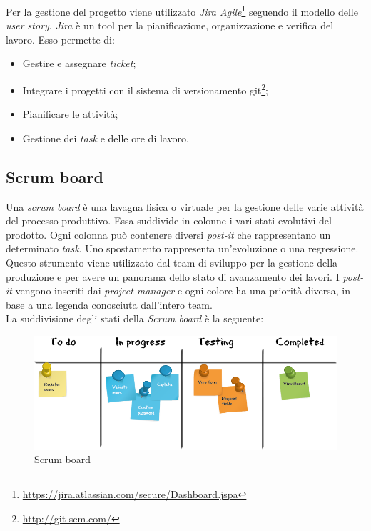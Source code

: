 Per la gestione del progetto viene utilizzato \textit{Jira Agile}\footnote{\url{https://jira.atlassian.com/secure/Dashboard.jspa}} seguendo il modello delle \textit{user story}. \textit{Jira} è un tool per la pianificazione, organizzazione e verifica del lavoro. Esso permette di:
\begin{itemize}
	\item Gestire e assegnare \textit{ticket};
	\item Integrare i progetti con il sistema di versionamento \gls{git}\footnote{\url{http://git-scm.com/}};
	\item Pianificare le attività;
	\item Gestione dei \textit{task }e delle ore di lavoro.
\end{itemize}

\subsection*{Scrum board}
Una \textit{scrum board }è una lavagna fisica o virtuale per la gestione delle varie attività del processo produttivo. Essa suddivide in colonne i vari stati evolutivi del prodotto. Ogni colonna può contenere diversi \textit{post-it} che rappresentano un determinato \textit{task}. Uno spostamento rappresenta un'evoluzione o una regressione. Questo strumento viene utilizzato dal team di sviluppo per la gestione della produzione e per avere un panorama dello stato di avanzamento dei lavori. I \textit{post-it} vengono inseriti dai \textit{project manager} e ogni colore ha una priorità diversa, in base a una legenda conosciuta dall'intero team. \\
La suddivisione degli stati della \textit{Scrum board }è la seguente:

\begin{figure}[h]
\centering
\includegraphics[width=1\linewidth]{immagini/scrum-board}
\caption[Scrum board]{Scrum board}
\label{fig:scrum-board}
\end{figure}

